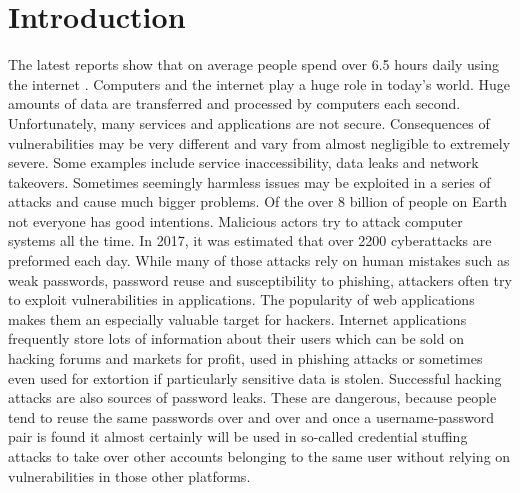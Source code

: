 \chapter{Introduction}
\label{chap:introduction}

The latest reports show that on average people spend over 6.5 hours daily using the internet \cite{bib:digital-2023}. Computers and the internet play a huge role in today's world. Huge amounts of data are transferred and processed by computers each second. Unfortunately, many services and applications are not secure. Consequences of vulnerabilities may be very different and vary from almost negligible to extremely severe. Some examples include service inaccessibility, data leaks and network takeovers. Sometimes seemingly harmless issues may be exploited in a series of attacks and cause much bigger problems. Of the over 8 billion of people on Earth \cite{bib:UN-8B-population} not everyone has good intentions. Malicious actors try to attack computer systems all the time. In 2017, it was estimated that over 2200 cyberattacks are preformed each day. While many of those attacks rely on human mistakes such as weak passwords, password reuse and susceptibility to phishing, attackers often try to exploit vulnerabilities in applications. The popularity of web applications makes them an especially valuable target for hackers. Internet applications frequently store lots of information about their users which can be sold on hacking forums and markets for profit, used in phishing attacks or sometimes even used for extortion if particularly sensitive data is stolen. Successful hacking attacks are also sources of password leaks. These are dangerous, because people tend to reuse the same passwords over and over and once a username-password pair is found it almost certainly will be used in so-called credential stuffing attacks to take over other accounts belonging to the same user without relying on vulnerabilities in those other platforms.

